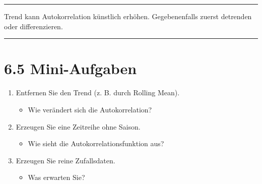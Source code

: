 \documentclass[
  ngerman,
  letterpaper,
  DIV=11]{scrreprt}
\providecommand{\tightlist}{%
  \setlength{\itemsep}{0pt}\setlength{\parskip}{0pt}}
\begin{document}
\begin{center}\rule{0.5\linewidth}{0.5pt}\end{center}

\begin{tcolorbox}[enhanced jigsaw, titlerule=0mm, title=\textcolor{quarto-callout-warning-color}{\faExclamationTriangle}\hspace{0.5em}{Achtung}, bottomrule=.15mm, opacityback=0, colbacktitle=quarto-callout-warning-color!10!white, coltitle=black, opacitybacktitle=0.6, colframe=quarto-callout-warning-color-frame, toprule=.15mm, leftrule=.75mm, arc=.35mm, rightrule=.15mm, breakable, bottomtitle=1mm, colback=white, toptitle=1mm, left=2mm]

Trend kann Autokorrelation künstlich erhöhen. Gegebenenfalls zuerst
detrenden oder differenzieren.

\end{tcolorbox}

\begin{center}\rule{0.5\linewidth}{0.5pt}\end{center}

\section{6.5 Mini-Aufgaben}\label{mini-aufgaben-2}

\begin{enumerate}
\def\labelenumi{\arabic{enumi}.}
\tightlist
\item
  Entfernen Sie den Trend (z. B. durch Rolling Mean).

  \begin{itemize}
  \tightlist
  \item
    Wie verändert sich die Autokorrelation?
  \end{itemize}
\item
  Erzeugen Sie eine Zeitreihe ohne Saison.

  \begin{itemize}
  \tightlist
  \item
    Wie sieht die Autokorrelationsfunktion aus?
  \end{itemize}
\item
  Erzeugen Sie reine Zufallsdaten.

  \begin{itemize}
  \tightlist
  \item
    Was erwarten Sie?
  \end{itemize}
\end{enumerate}
\end{document}
